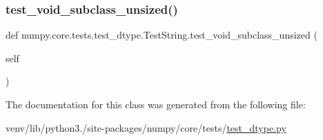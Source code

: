 \subsubsection{\texorpdfstring{test\+\_\+void\+\_\+subclass\+\_\+unsized()}{test\_void\_subclass\_unsized()}}
{\footnotesize\ttfamily def numpy.\+core.\+tests.\+test\+\_\+dtype.\+Test\+String.\+test\+\_\+void\+\_\+subclass\+\_\+unsized (\begin{DoxyParamCaption}\item[{}]{self }\end{DoxyParamCaption})}



The documentation for this class was generated from the following file\+:\begin{DoxyCompactItemize}
\item 
venv/lib/python3./site-\/packages/numpy/core/tests/\hyperlink{test__dtype_8py}{test\+\_\+dtype.\+py}\end{DoxyCompactItemize}
